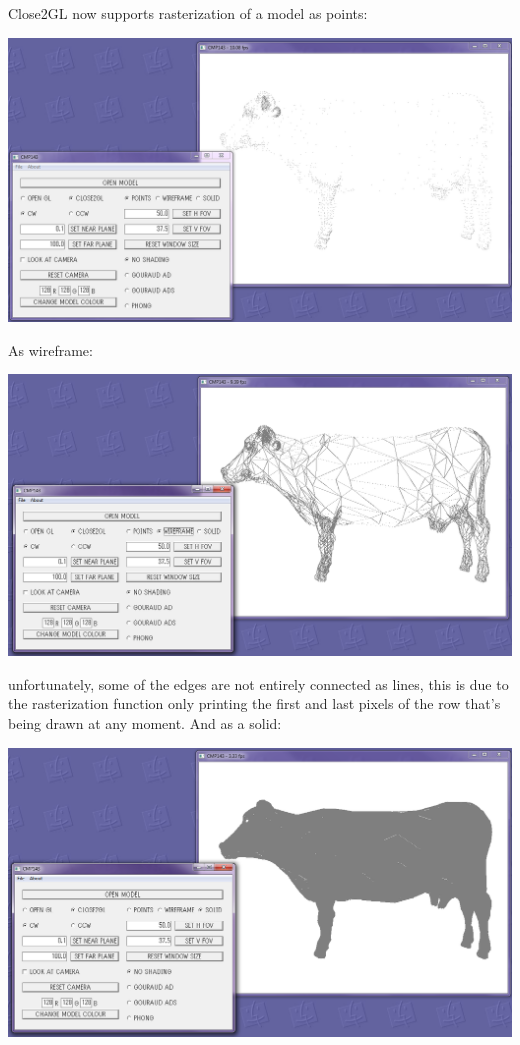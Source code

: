 \documentclass[12pt]{article}
\begin{document}
Close2GL now supports rasterization of a model as points:
\begin{center}
\includegraphics[scale=0.45]{3.png}
\end{center}
\newpage
As wireframe:
\begin{center}
\includegraphics[scale=0.45]{2.png}
\end{center}
unfortunately, some of the edges are not entirely connected as lines, this is due to the rasterization function only printing the first and last pixels of the row that's being drawn at any moment.
\newpage
And as a solid:
\begin{center}
\includegraphics[scale=0.45]{1.png}
\end{center}
\end{document}
